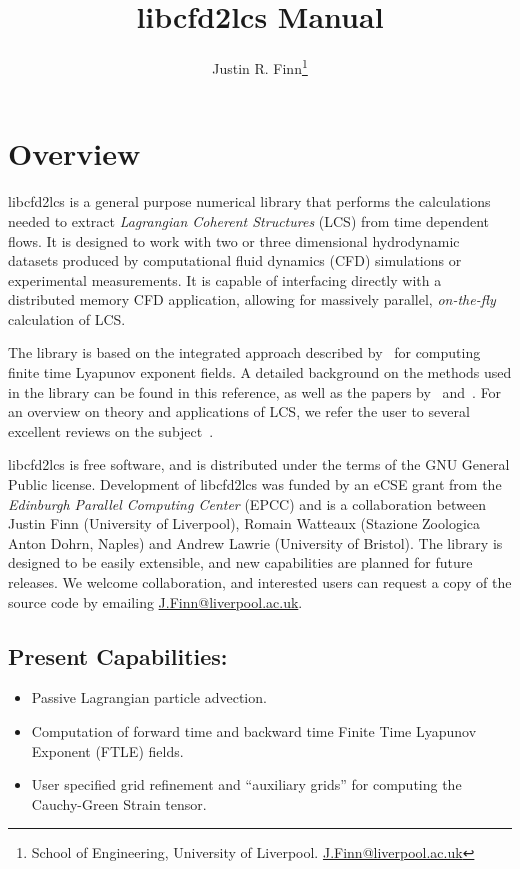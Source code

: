 \documentclass[letterpaper,11pt]{article}
\title{libcfd2lcs Manual}
\author{Justin R. Finn\thanks{School of Engineering, University of Liverpool.  \href{mailto:J.Finn@liverpool.ac.uk}{J.Finn@liverpool.ac.uk}}}
\begin{document}
\maketitle
\section{Overview}
libcfd2lcs is a general purpose numerical library that performs the calculations needed to extract \emph{Lagrangian Coherent Structures} (LCS) from time dependent flows.  It is designed to work with two or three dimensional hydrodynamic datasets produced by computational fluid dynamics (CFD) simulations or experimental measurements.  It is capable of interfacing directly with a distributed memory CFD application, allowing for massively parallel, \emph{on-the-fly} calculation of LCS.

The library is based on the integrated approach described by~\cite{finn2013integrated} for computing finite time Lyapunov exponent fields.  A detailed background on the methods used in the library can be found in this reference, as well as the papers by~\cite{brunton2010fast} and~\cite{leung2011eulerian}.  For an overview on theory and applications of LCS, we refer the user to several excellent reviews on the subject~\cite{haller2015lagrangian,peacock2015introduction,peacock2010introduction,samelson2013lagrangian}.

libcfd2lcs is free software, and is distributed under the terms of the GNU General Public license.  Development of libcfd2lcs was funded by an eCSE grant from the \emph{Edinburgh Parallel Computing Center} (EPCC) and is a collaboration between Justin Finn (University of Liverpool), Romain Watteaux (Stazione Zoologica Anton Dohrn, Naples) and Andrew Lawrie (University of Bristol).  The library is designed to be easily extensible, and new capabilities are planned for future releases.  We welcome collaboration, and interested users can request a copy of the source code by emailing \href{mailto:J.Finn@liverpool.ac.uk}{J.Finn@liverpool.ac.uk}.
 
\subsection*{Present Capabilities:}
 \begin{itemize}
 \item Passive Lagrangian particle advection.
 \item Computation of forward time and backward time Finite Time Lyapunov Exponent (FTLE) fields.
 \item User specified grid refinement and ``auxiliary grids'' for computing the Cauchy-Green Strain tensor. 
\end{itemize}
\end{document}
